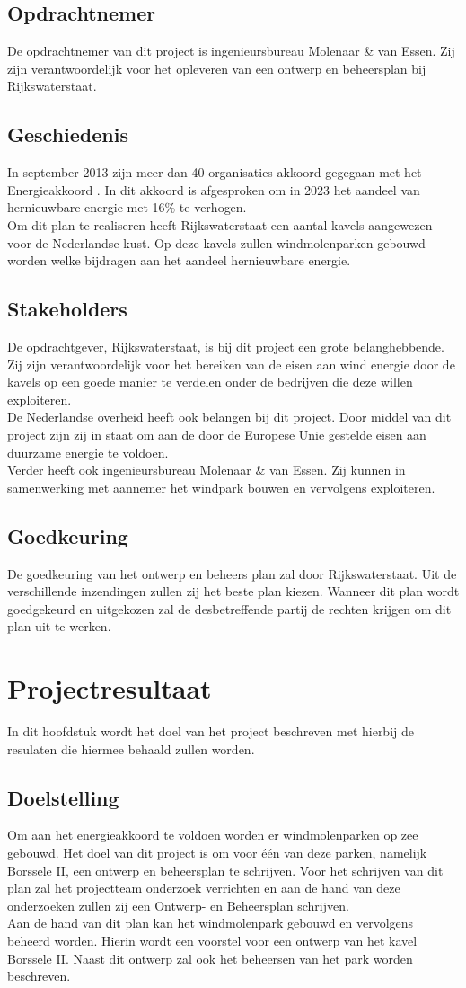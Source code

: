 \documentclass[numbers=endperiod]{scrartcl}
\newcommand{\sectionSmall}[1]{
	\vspace{-10pt}
	\section{#1}
	\vspace{-5pt}
}
\newcommand{\whitespace}{\vspace*{2 mm} \\}%
\begin{document}
	\subsection{Opdrachtnemer}
	De opdrachtnemer van dit project is ingenieursbureau Molenaar \& van Essen. Zij zijn verantwoordelijk voor het opleveren van een ontwerp en beheersplan bij Rijkswaterstaat.
	\subsection{Geschiedenis}
	In september 2013 zijn meer dan 40 organisaties akkoord gegegaan met het Energieakkoord \cite{SER:2013:Online}. In dit akkoord is afgesproken om in 2023 het aandeel van hernieuwbare energie met 16\% te verhogen.
	\whitespace
	Om dit plan te realiseren heeft Rijkswaterstaat een aantal kavels aangewezen voor de Nederlandse kust. Op deze kavels zullen windmolenparken gebouwd worden welke bijdragen aan het aandeel hernieuwbare energie.
	\subsection{Stakeholders}
	De opdrachtgever, Rijkswaterstaat, is bij dit project een grote belanghebbende. Zij zijn verantwoordelijk voor het bereiken van de eisen aan wind energie door de kavels op een goede manier te verdelen onder de bedrijven die deze willen exploiteren.
	\whitespace
	De Nederlandse overheid heeft ook belangen bij dit project. Door middel van dit project zijn zij in staat om aan de door de Europese Unie gestelde eisen aan duurzame energie te voldoen.
	\whitespace
	Verder heeft ook ingenieursbureau Molenaar \& van Essen. Zij kunnen in samenwerking met aannemer het windpark bouwen en vervolgens exploiteren.
	\subsection{Goedkeuring}
	De goedkeuring van het ontwerp en beheers plan zal door Rijkswaterstaat. Uit de verschillende inzendingen zullen zij het beste plan kiezen. Wanneer dit plan wordt goedgekeurd en uitgekozen zal de desbetreffende partij de rechten krijgen om dit plan uit te werken.
	\newpage
	
	\sectionSmall{Projectresultaat}
	In dit hoofdstuk wordt het doel van het project beschreven met hierbij de resulaten die hiermee behaald zullen worden.
	
	\subsection{Doelstelling}
	Om aan het energieakkoord te voldoen worden er windmolenparken op zee gebouwd. Het doel van dit project is om voor één van deze parken, namelijk Borssele II, een ontwerp en beheersplan te schrijven. Voor het schrijven van dit plan zal het projectteam onderzoek verrichten en aan de hand van deze onderzoeken zullen zij een Ontwerp- en Beheersplan schrijven.
	\whitespace
	Aan de hand van dit plan kan het windmolenpark gebouwd en vervolgens beheerd worden. Hierin wordt een voorstel voor een ontwerp van het kavel Borssele II. Naast dit ontwerp zal ook het beheersen van het park worden beschreven.
	
\end{document}
